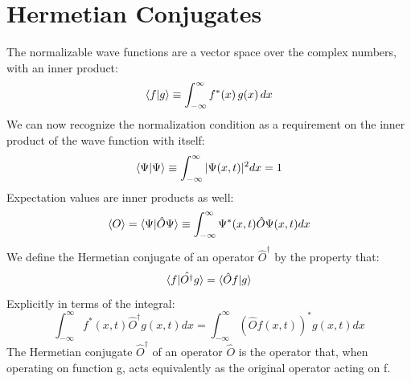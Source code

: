 \documentclass[12pt]{book}
\begin{document}
\section{Hermetian Conjugates}
The normalizable wave functions are a vector space over the complex numbers, with an inner product:
\begin{equation}
\braket{f|g} \equiv \int_{-\infty}^{\infty} f^*(x) \, g(x) \, dx
\end{equation}
We can now recognize the normalization condition as a requirement on the inner product of the wave function with itself:
\begin{equation}
\braket{\Psi|\Psi} \equiv \int_{-\infty}^{\infty} |\Psi(x,t)|^2 dx = 1
\end{equation}
Expectation values are inner products as well:
\begin{equation}
\braket{O} = \braket{\Psi|\hat{O}\Psi} \equiv \int_{-\infty}^{\infty} \Psi^*(x,t)\hat{O}\Psi(x,t) dx
\end{equation}
We define the Hermetian conjugate of an operator $\hat{O}^{\dagger}$ by the property that:
\begin{equation}
\braket{f|\hat{O^\dagger}g} = \braket{\hat{O} f| g}
\end{equation}
Explicitly in terms of the integral:
\begin{equation}
\int_{-\infty}^{\infty} f^*(x,t)\hat{O}^\dagger g(x,t) dx = 
\int_{-\infty}^{\infty} \left( \hat{O} f(x,t)\right)^* g(x,t) dx
\end{equation}
The Hermetian conjugate $\hat{O}^\dagger$ of an operator $\hat{O}$ is the operator that, when operating on function g, acts equivalently as the original operator acting on f.
\end{document}
